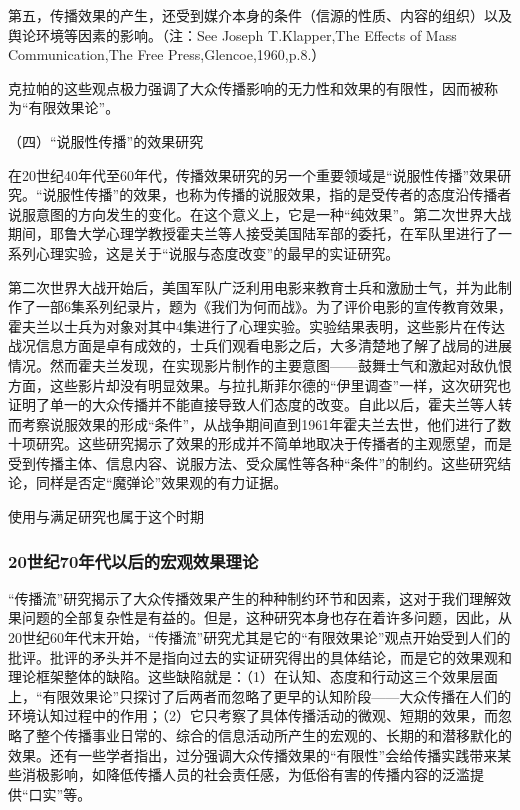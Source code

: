 \documentclass[UTF8,12pt]{ctexart}
\numberwithin{equation}{section} %
\numberwithin{figure}{section}
\numberwithin{table}{section}
\begin{document}
	第五，传播效果的产生，还受到媒介本身的条件（信源的性质、内容的组织）以及舆论环境等因素的影响。（注：See Joseph T.Klapper,The Effects of Mass Communication,The Free Press,Glencoe,1960,p.8.）
	
	克拉帕的这些观点极力强调了大众传播影响的无力性和效果的有限性，因而被称为“有限效果论”。
	
	（四）“说服性传播”的效果研究
	
	在20世纪40年代至60年代，传播效果研究的另一个重要领域是“说服性传播”效果研究。“说服性传播”的效果，也称为传播的说服效果，指的是受传者的态度沿传播者说服意图的方向发生的变化。在这个意义上，它是一种“纯效果”。第二次世界大战期间，耶鲁大学心理学教授霍夫兰等人接受美国陆军部的委托，在军队里进行了一系列心理实验，这是关于“说服与态度改变”的最早的实证研究。
	
	第二次世界大战开始后，美国军队广泛利用电影来教育士兵和激励士气，并为此制作了一部6集系列纪录片，题为《我们为何而战》。为了评价电影的宣传教育效果，霍夫兰以士兵为对象对其中4集进行了心理实验。实验结果表明，这些影片在传达战况信息方面是卓有成效的，士兵们观看电影之后，大多清楚地了解了战局的进展情况。然而霍夫兰发现，在实现影片制作的主要意图——鼓舞士气和激起对敌仇恨方面，这些影片却没有明显效果。与拉扎斯菲尔德的“伊里调查”一样，这次研究也证明了单一的大众传播并不能直接导致人们态度的改变。自此以后，霍夫兰等人转而考察说服效果的形成“条件”，从战争期间直到1961年霍夫兰去世，他们进行了数十项研究。这些研究揭示了效果的形成并不简单地取决于传播者的主观愿望，而是受到传播主体、信息内容、说服方法、受众属性等各种“条件”的制约。这些研究结论，同样是否定“魔弹论”效果观的有力证据。
	
	使用与满足研究也属于这个时期
	
	\subsubsection{20世纪70年代以后的宏观效果理论}
	
	“传播流”研究揭示了大众传播效果产生的种种制约环节和因素，这对于我们理解效果问题的全部复杂性是有益的。但是，这种研究本身也存在着许多问题，因此，从20世纪60年代末开始，“传播流”研究尤其是它的“有限效果论”观点开始受到人们的批评。批评的矛头并不是指向过去的实证研究得出的具体结论，而是它的效果观和理论框架整体的缺陷。这些缺陷就是：（1）在认知、态度和行动这三个效果层面上，“有限效果论”只探讨了后两者而忽略了更早的认知阶段——大众传播在人们的环境认知过程中的作用；（2）它只考察了具体传播活动的微观、短期的效果，而忽略了整个传播事业日常的、综合的信息活动所产生的宏观的、长期的和潜移默化的效果。还有一些学者指出，过分强调大众传播效果的“有限性”会给传播实践带来某些消极影响，如降低传播人员的社会责任感，为低俗有害的传播内容的泛滥提供“口实”等。
	
\end{document}
